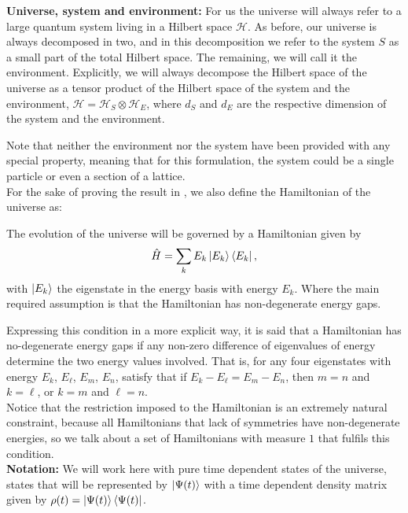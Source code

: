 \textbf{Universe, system and environment:} For us the universe will always refer to a large quantum system living in a Hilbert space $\mathcal{H}$. As before, our universe is always decomposed in two,  and in this decomposition we refer to the system $S$ as a small part of the total Hilbert space. The remaining, we will call it the environment. Explicitly, we will always decompose the Hilbert space of the universe as a tensor product of the Hilbert space of the system and the environment, $\mathcal{H}=\mathcal{H}_S\otimes \mathcal{H}_E$, where $d_S$ and $d_E$ are the respective dimension of the system and the environment. 

Note that neither the environment nor the system have been provided with any special property, meaning that for this formulation, the system could be a single particle or even a section of a lattice.\\
\indent For the sake of proving the result in \cite{linden_quantum_2009}, we also define the Hamiltonian of the universe as:
\begin{definition}[Hamiltonian]
The evolution of the universe will be governed by a Hamiltonian given by
\begin{equation}
\hat{H}=\sum_{k}E_k\mathinner{|{E_k}\rangle}\mathinner{\langle{E_k}|},
\label{CH1:Hamiltonian_universe_linden}
\end{equation}
with $\mathinner{|{E_k}\rangle}$ the eigenstate in the energy basis with energy $E_k$. Where the main required assumption is that the Hamiltonian has non-degenerate energy gaps.
\end{definition}
Expressing this condition in a more  explicit way, it is said that a Hamiltonian has no-degenerate energy gaps if any non-zero difference of eigenvalues of energy determine the two energy values involved. That is, for any four eigenstates with energy $E_k$, $E_\ell$, $E_m$, $E_n$, satisfy that if $E_{k}-E_{\ell}=E_{m}-E_{n}$, then $m=n$ and $k=\ell$, or $k=m$ and $\ell = n$. \\
\indent Notice that the restriction imposed to the Hamiltonian is an extremely natural constraint, because all Hamiltonians that lack of symmetries have non-degenerate energies, so we talk about a set of Hamiltonians with measure $1$ that fulfils this condition.\\
\textbf{Notation:} We will work here with pure time dependent states of the universe, states that will be represented by $\mathinner{|{\Psi(t)}\rangle}$ with a time dependent density matrix given by $\rho(t) =\mathinner{|{\Psi(t)}\rangle}\mathinner{\langle{\Psi(t)}|}$. 

